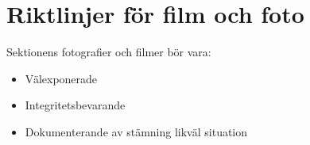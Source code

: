 \documentclass[]{dsekkallelse}
\begin{document}
\section{Riktlinjer för film och foto}
Sektionens fotografier och filmer bör vara:
\begin{itemize}
    \item Välexponerade
    \item Integritetsbevarande
    \item Dokumenterande av stämning likväl situation
\end{itemize}



\end{document}
